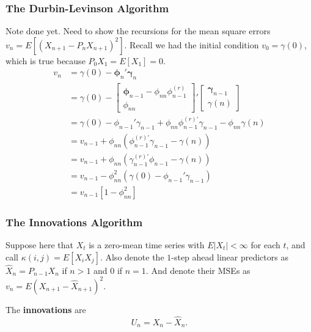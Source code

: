 \documentclass{beamer}
\begin{document}
\begin{frame}
\frametitle{The Durbin-Levinson Algorithm}

Note done yet. Need to show the recursions for the mean square errors $v_n = E[(X_{n+1} - P_nX_{n+1})^2] $. Recall we had the initial condition $v_0 = \gamma(0)$, which is true because $P_0X_1 = E[X_1] = 0$. 
\begin{align*}
v_n &= \gamma(0) - \bm{\phi}_n'\bm{\gamma}_n \tag{2.5 slide 7} \\
&= \gamma(0) - 
\left[ \begin{array}{c}
\bm{\phi}_{n-1} -\phi_{nn}\phi_{n-1}^{(r)} \\
\phi_{nn}
\end{array}\right]' 
\left[\begin{array}{c}
\bm{\gamma}_{n-1} \\
\gamma(n)
\end{array}\right]\tag{DL2} \\
&= \gamma(0) - \phi_{n-1}'\gamma_{n-1} + \phi_{nn}\phi_{n-1}^{(r)'}\gamma_{n-1} - \phi_{nn}\gamma(n) \\
&= v_{n-1}+ \phi_{nn}\left( \phi_{n-1}^{(r)'}\gamma_{n-1} - \gamma(n) \right) \tag{2.5 slide 7} \\
&= v_{n-1} + \phi_{nn}\left( \gamma_{n-1}^{(r)'} \phi_{n-1} - \gamma(n) \right) \tag{algebra} \\
&= v_{n-1} - \phi_{nn}^2\left( \gamma(0) - \phi_{n-1}'\gamma_{n-1} \right) \tag{DL1} \\
&=v_{n-1}[1-\phi_{nn}^2]
\end{align*}

\end{frame}



\begin{frame}
\frametitle{The Innovations Algorithm}

Suppose here that $X_t$ is a zero-mean time series with $E|X_t| < \infty$ for each $t$, and call $\kappa(i,j) = E[X_iX_j]$. Also denote the $1$-step ahead linear predictors as $\hat{X}_n = P_{n-1}X_n$ if $n > 1$ and $0$ if $n=1$. And denote their MSEs as $v_n = E(X_{n+1} - \hat{X}_{n+1})^2$.
\newline

The {\bf innovations} are 
\[
U_n = X_n - \hat{X}_n.
\]


\end{frame}

\end{document}
